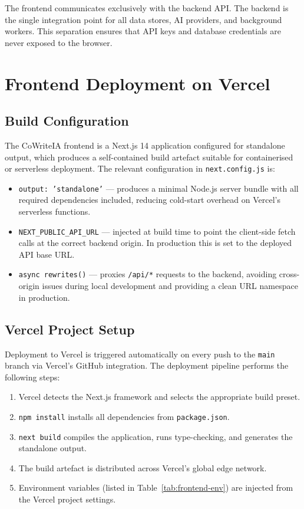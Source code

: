 The frontend communicates exclusively with the backend API. The backend is the single integration point for all data stores, AI providers, and background workers. This separation ensures that API keys and database credentials are never exposed to the browser.

\section{Frontend Deployment on Vercel}
\label{sec:frontend-vercel}

\subsection{Build Configuration}

The CoWriteIA frontend is a Next.js 14 application configured for standalone output, which produces a self-contained build artefact suitable for containerised or serverless deployment. The relevant configuration in \texttt{next.config.js} is:

\begin{itemize}
    \item \texttt{output: 'standalone'} — produces a minimal Node.js server bundle with all required dependencies included, reducing cold-start overhead on Vercel's serverless functions.
    \item \texttt{NEXT\_PUBLIC\_API\_URL} — injected at build time to point the client-side fetch calls at the correct backend origin. In production this is set to the deployed API base URL.
    \item \texttt{async rewrites()} — proxies \texttt{/api/*} requests to the backend, avoiding cross-origin issues during local development and providing a clean URL namespace in production.
\end{itemize}

\subsection{Vercel Project Setup}

Deployment to Vercel is triggered automatically on every push to the \texttt{main} branch via Vercel's GitHub integration. The deployment pipeline performs the following steps:

\begin{enumerate}
    \item Vercel detects the Next.js framework and selects the appropriate build preset.
    \item \texttt{npm install} installs all dependencies from \texttt{package.json}.
    \item \texttt{next build} compiles the application, runs type-checking, and generates the standalone output.
    \item The build artefact is distributed across Vercel's global edge network.
    \item Environment variables (listed in Table~\ref{tab:frontend-env}) are injected from the Vercel project settings.
\end{enumerate}

